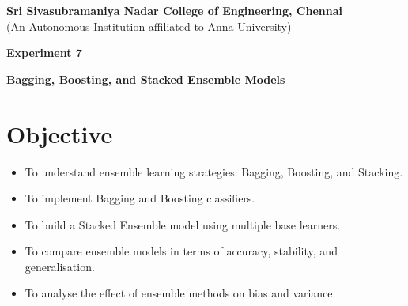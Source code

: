 \documentclass[11pt]{article}
\begin{document}
\begin{center}
    \Large \textbf{Sri Sivasubramaniya Nadar College of Engineering, Chennai} \\
    \large (An Autonomous Institution affiliated to Anna University) \\
    \vspace{0.3cm}
\end{center}

\begin{table}[h!]
\renewcommand{\arraystretch}{1.5}
\centering
{}
\end{table}

\begin{center}
    \textbf{\Large Experiment 7}
\end{center}

\begin{center}
    \textbf{Bagging, Boosting, and Stacked Ensemble Models}
\end{center}

\section*{Objective}
\begin{itemize}
    \item To understand ensemble learning strategies: Bagging, Boosting, and Stacking.
    \item To implement Bagging and Boosting classifiers.
    \item To build a Stacked Ensemble model using multiple base learners.
    \item To compare ensemble models in terms of accuracy, stability, and generalisation.
    \item To analyse the effect of ensemble methods on bias and variance.
\end{itemize}
\end{document}

